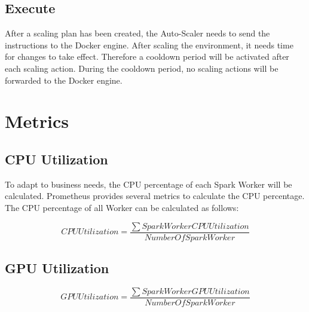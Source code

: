 \subsection{Execute}
After a scaling plan has been created, the Auto-Scaler needs to send the instructions to the Docker engine.
After scaling the environment, it needs time for changes to take effect. Therefore a cooldown period will be activated after each scaling action.
During the cooldown period, no scaling actions will be forwarded to the Docker engine.


\section{Metrics}

\subsection{CPU Utilization}

To adapt to business needs, the CPU percentage of each Spark Worker will be calculated. Prometheus provides several metrics to calculate the CPU percentage. The CPU percentage of all Worker can be calculated as follows:

\begin{equation}
CPUUtilization = \dfrac{\sum SparkWorkerCPUUtilization}{NumberOfSparkWorker}
\label{eq:formel}
\end{equation}


\subsection{GPU Utilization}

\begin{equation}
GPUUtilization = \dfrac{\sum SparkWorkerGPUUtilization}{NumberOfSparkWorker}
\label{eq:formel}
\end{equation}

